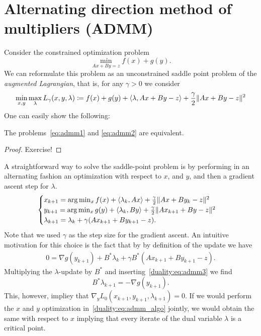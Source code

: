 \section{Alternating direction method of multipliers (ADMM)}
Consider the constrained optimization problem
\begin{equation}\label{eq:admm1}
    \min_{Ax + By = z} f(x) + g(y).
\end{equation}
We can reformulate this problem as an unconstrained saddle point problem of the \emph{augmented Lagrangian}, that is, for any $\gamma>0$ we consider
\begin{equation}\label{eq:admm2}
    \min_{x,y}\max_{\lambda} L_\gamma (x,y,\lambda) \coloneqq f(x) + g(y) + \left\langle\lambda , Ax + By - z\right\rangle + \frac{\gamma}{2}\|Ax + By - z\|^2
\end{equation}
One can easily show the following:
\begin{lemma}
    The problems~\eqref{eq:admm1} and \eqref{eq:admm2} are equivalent.
\end{lemma}
\begin{proof}
    Exercise!
\end{proof}
A straightforward way to solve the saddle-point problem is by performing in an alternating fashion an optimization with respect to $x$, and $y$, and then a gradient ascent step for $\lambda$.
\begin{equation}\label{duality:eq:admm_algo}
    \begin{cases}
        x_{k+1} = \arg\min_{x} f(x) + \left\langle\lambda_k , Ax\right\rangle + \frac{\gamma}{2}\|Ax + By_k - z\|^2\\
        y_{k+1} = \arg\min_{x} g(y) + \left\langle\lambda_k , By\right\rangle + \frac{\gamma}{2}\|Ax_{k+1} + By - z\|^2\\
        \lambda_{k+1} = \lambda_k + \gamma (Ax_{k+1} + By_{k+1} - z).
    \end{cases}
\end{equation}
Note that we used $\gamma$ as the step size for the gradient ascent. An intuitive motivation for this choice is the fact that by by definition of the update we have
\begin{equation}\label{duality:eq:admm3}
    \begin{aligned}
        0 = \nabla g(y_{k+1}) + B^* \lambda_k + \gamma B^*(Ax_{k+1} + By_{k+1}-z).
    \end{aligned}
\end{equation}
Multiplying the $\lambda$-update by $B^*$ and inserting~\eqref{duality:eq:admm3} we find
\begin{equation}
    B^*\lambda_{k+1} = -\nabla g(y_{k+1}).
\end{equation}
This, however, impliey that $\nabla_y L_0(x_{k+1}, y_{k+1},\lambda_{k+1})=0$. If we would perform the $x$ and $y$ optimization in~\eqref{duality:eq:admm_algo} jointly, we would obtain the same with respect to $x$ implying that every iterate of the dual variable $\lambda$ is a critical point.

